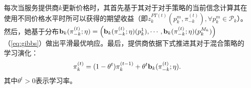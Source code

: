 每次当服务提供商$k$更新价格时，其首先基于其对于对手策略的当前信念计算其在使用不同价格水平时所可以获得的期望收益（即$z^{PT(t)}_k(p^m_k,\pi^{(t)}_{-k}),\forall p^m_k\in\mathcal{P}_k$）。然后，她基于分布$\bold{b}_k(\pi_{-k}^{(t)};\eta)=\left(\bold{b}_k(\pi_{-k}^{(t)};\eta)(p_k^{1}),\cdots,\bold{b}_k(\pi_{-k}^{(t)};\eta)(p_k^{M_k})\right)$（\ref{eq:gibbs}）做出平滑最优响应。最后，提供商依据下式推进其对于混合策略的学习演化：
\begin{equation}\label{eq:mixed}
\pi_k^{(t)}=(1-\theta^t)\pi_k^{(t-1)}+\theta^t\bold{b}_k(\pi_{-k}^{(t)};\eta).
\end{equation}
其中$\theta^t>0$表示学习率。%
